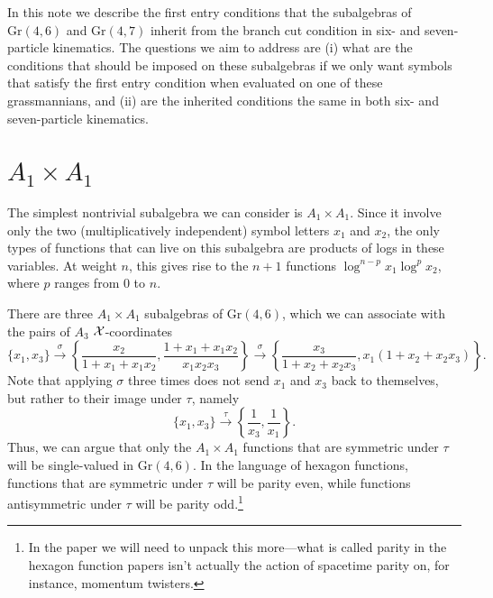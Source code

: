 \documentclass[12pt]{article}
\begin{document}
\thispagestyle{fancyplain}
 
\fancyhf{}
 
\cfoot{\fancyplain{}{\thepage}}


\noindent In this note we describe the first entry conditions that the subalgebras of $\text{Gr}(4,6)$ and $\text{Gr}(4,7)$ inherit from the branch cut condition in six- and seven-particle kinematics. The questions we aim to address are (i) what are the conditions that should be imposed on these subalgebras if we only want symbols that satisfy the first entry condition when evaluated on one of these grassmannians, and (ii) are the inherited conditions the same in both six- and seven-particle kinematics. 

\section*{$A_1 \times A_1$}
The simplest nontrivial subalgebra we can consider is $A_1 \times A_1$. Since it involve only the two (multiplicatively independent) symbol letters $x_1$ and $x_2$, the only types of functions that can live on this subalgebra are products of logs in these variables. At weight $n$, this gives rise to the $n+1$ functions $\log^{n-p} x_1 \log^{p} x_2$, where $p$ ranges from 0 to $n$. 

There are three $A_1 \times A_1$ subalgebras of $\text{Gr}(4,6)$, which we can associate with the pairs of $A_3$ ${\cal X}$-coordinates 
$$\{ x_1, x_3 \} \xrightarrow{\sigma} \left \{ \frac{x_2}{1 + x_1 + x_1 x_2}, \frac{1 + x_1 + x_1 x_2}{x_1 x_2 x_3} \right \} \xrightarrow{\sigma} \left \{ \frac{x_3}{1 + x_2 + x_2 x_3}, x_1 (1 + x_2 + x_2 x_3) \right \}. $$
Note that applying $\sigma$ three times does not send $x_1$ and $x_3$ back to themselves, but rather to their image under $\tau$, namely 
$$\{ x_1, x_3 \} \xrightarrow{\tau} \left \{ \frac{1}{x_3}, \frac{1}{x_1} \right \}. $$
Thus, we can argue that only the $A_1 \times A_1$ functions that are symmetric under $\tau$ will be single-valued in $\text{Gr}(4,6)$. In the language of hexagon functions, functions that are symmetric under $\tau$ will be parity even, while functions antisymmetric under $\tau$ will be parity odd.\footnote{In the paper we will need to unpack this more---what is called parity in the hexagon function papers isn't actually the action of spacetime parity on, for instance, momentum twisters.}
\end{document}
